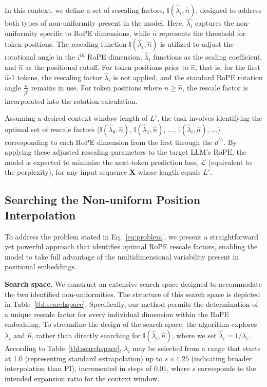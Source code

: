 In this context, we define a set of rescaling factors, $\mathbb{I}(\hat{\lambda}_{i},\hat{n})$, designed to address both types of non-uniformity present in the model. Here, $\hat{\lambda_i}$ captures the non-uniformity specific to RoPE dimensions, while $\hat{n}$ represents the threshold for token positions. The rescaling function $\mathbb{I}(\hat{\lambda}_{i},\hat{n})$ is utilized to adjust the rotational angle in the $i^{th}$ RoPE dimension; $\hat\lambda_{i}$ functions as the scaling coefficient, and $\hat{n}$ as the positional cutoff. For token positions prior to $\hat{n}$, that is, for the first $\hat{n}$-1 tokens, the rescaling factor $\hat\lambda_{i}$ is not applied, and the standard RoPE rotation angle $\frac{n}{\beta^i}$ remains in use. For token positions where $n \ge \hat{n}$, the rescale factor is incorporated into the rotation calculation.

Assuming a desired context window length of $L'$, the task involves identifying the optimal set of rescale factors ($\mathbb{I}(\hat{\lambda}_{0},\hat{n})$, $\mathbb{I}(\hat{\lambda}_{1},\hat{n})$, ..., $\mathbb{I}(\hat{\lambda}_{i},\hat{n})$, ...) corresponding to each RoPE dimension from the first through the $d^{th}$. By applying these adjusted rescaling parameters to the target $\text{LLM}$'s $\text{RoPE}$, the model is expected to minimize the next-token prediction loss, $\mathcal{L}$ (equivalent to the perplexity), for any input sequence $\mathbf{X}$ whose length equals $L'$.

\subsection{Searching the Non-uniform Position Interpolation}

To address the problem stated in Eq.~\ref{eq:problem}, we present a straightforward yet powerful approach that identifies optimal RoPE rescale factors, enabling the model to take full advantage of the multidimensional variability present in positional embeddings.

\textbf{Search space}. We construct an extensive search space designed to accommodate the two identified non-uniformities. The structure of this search space is depicted in Table~\ref{tbl:searchspace}. Specifically, our method permits the determination of a unique rescale factor for every individual dimension within the RoPE embedding. To streamline the design of the search space, the algorithm explores $\lambda_i$ and $\hat{n}$, rather than directly searching for $\mathbb{I}(\hat{\lambda}_{i},\hat{n})$, where we set $\hat{\lambda}_{i}=1/\lambda_i$. According to Table~\ref{tbl:searchspace}, $\lambda_i$ may be selected from a range that starts at 1.0 (representing standard extrapolation) up to $s\times1.25$ (indicating broader interpolation than PI), incremented in steps of 0.01, where $s$ corresponds to the intended expansion ratio for the context window.

